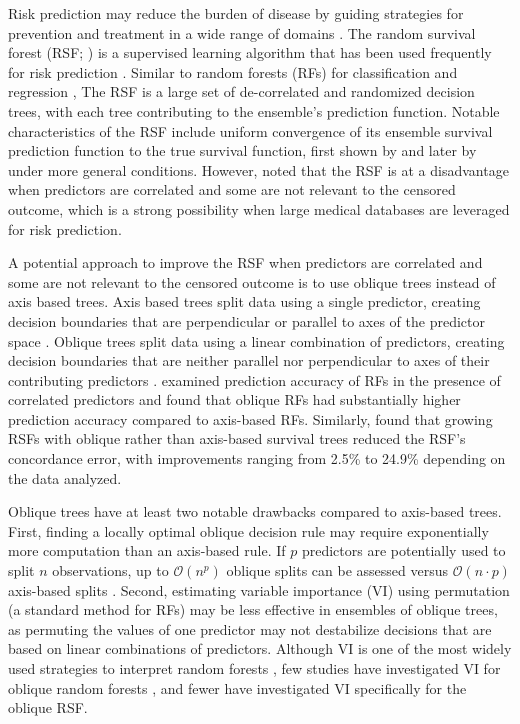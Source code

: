 \documentclass{article}\usepackage[]{graphicx}\usepackage[]{xcolor}
\begin{document}
Risk prediction may reduce the burden of disease by guiding strategies for prevention and treatment in a wide range of domains \citep{moons2012riskII, moons2012riskI}. The random survival forest (RSF; \citet{ishwaran2008random, hothorn2006unbiased}) is a supervised learning algorithm that has been used frequently for risk prediction \citep{wang2017selective}. Similar to random forests (RFs) for classification and regression \citep{breiman2001random}, The RSF is a large set of de-correlated and randomized decision trees, with each tree contributing to the ensemble's prediction function. Notable characteristics of the RSF include uniform convergence of its ensemble survival prediction function to the true survival function, first shown by \citet{ishwaran2010consistency} and later by \citet{cui2017consistency} under more general conditions. However, \citet{cui2017consistency} noted that the RSF is at a disadvantage when predictors are correlated and some are not relevant to the censored outcome, which is a strong possibility when large medical databases are leveraged for risk prediction.

A potential approach to improve the RSF when predictors are correlated and some are not relevant to the censored outcome is to use oblique trees instead of axis based trees. Axis based trees split data using a single predictor, creating decision boundaries that are perpendicular or parallel to axes of the predictor space \citep[see][Chapter~2]{breiman2017classification}. Oblique trees split data using a linear combination of predictors, creating decision boundaries that are neither parallel nor perpendicular to axes of their contributing predictors \citep[see][Chapter~5]{breiman2017classification}. \citet{menze2011oblique} examined prediction accuracy of RFs in the presence of correlated predictors and found that oblique RFs had substantially higher prediction accuracy compared to axis-based RFs. Similarly, \citet{jaeger2019oblique} found that growing RSFs with oblique rather than axis-based survival trees reduced the RSF's concordance error, with improvements ranging from 2.5\% to 24.9\% depending on the data analyzed.

Oblique trees have at least two notable drawbacks compared to axis-based trees. First, finding a locally optimal oblique decision rule may require exponentially more computation than an axis-based rule. If $p$ predictors are potentially used to split $n$ observations, up to $\mathcal{O}(n^p)$ oblique splits can be assessed versus $\mathcal{O}(n \cdot p)$ axis-based splits \citep{heath1993induction, murthy1994system}. Second, estimating variable importance (VI) using permutation (a standard method for RFs) may be less effective in ensembles of oblique trees, as permuting the values of one predictor may not destabilize decisions that are based on linear combinations of predictors. Although VI is one of the most widely used strategies to interpret random forests \citep{ishwaran2019standard}, few studies have investigated VI for oblique random forests \citep[see][Section~5]{menze2011oblique}, and fewer have investigated VI specifically for the oblique RSF.
\end{document}
